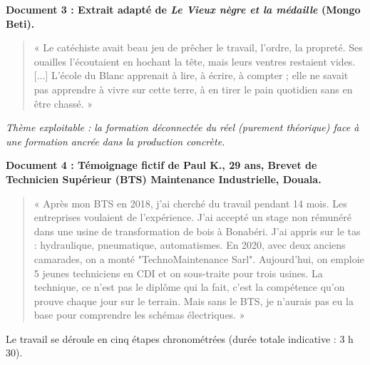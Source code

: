 \documentclass[11pt]{article}
\newcounter{popsec}
\newcounter{popsub}
\newcommand{\courssub}[1]{%
  \stepcounter{popsub}%
  \par\vspace{9pt}\noindent{\popxbold\fontsize{11.5}{13}\selectfont\color{popink}{\color{poporange}\thepopsec.\thepopsub}\hspace{6pt}#1}\par\nopagebreak\vspace{4pt}
}
\begin{document}
\textbf{Document 3 : Extrait adapté de \emph{Le Vieux nègre et la médaille} (Mongo Beti).}
\begin{quote}
« Le catéchiste avait beau jeu de prêcher le travail, l'ordre, la propreté. Ses ouailles l'écoutaient en hochant la tête, mais leurs ventres restaient vides. [...] L'école du Blanc apprenait à lire, à écrire, à compter ; elle ne savait pas apprendre à vivre sur cette terre, à en tirer le pain quotidien sans en être chassé. »
\end{quote}
\emph{Thème exploitable : la formation déconnectée du réel (purement théorique) face à une formation ancrée dans la production concrète.}

\textbf{Document 4 : Témoignage fictif de Paul K., 29 ans, Brevet de Technicien Supérieur (BTS) Maintenance Industrielle, Douala.}
\begin{quote}
« Après mon BTS en 2018, j'ai cherché du travail pendant 14 mois. Les entreprises voulaient de l'expérience. J'ai accepté un stage non rémunéré dans une usine de transformation de bois à Bonabéri. J'ai appris sur le tas : hydraulique, pneumatique, automatismes. En 2020, avec deux anciens camarades, on a monté "TechnoMaintenance Sarl". Aujourd'hui, on emploie 5 jeunes techniciens en CDI et on sous-traite pour trois usines. La technique, ce n'est pas le diplôme qui la fait, c'est la compétence qu'on prouve chaque jour sur le terrain. Mais sans le BTS, je n'aurais pas eu la base pour comprendre les schémas électriques. »
\end{quote}

\courssub{Consignes}
Le travail se déroule en cinq étapes chronométrées (durée totale indicative : 3 h 30).
\end{document}
